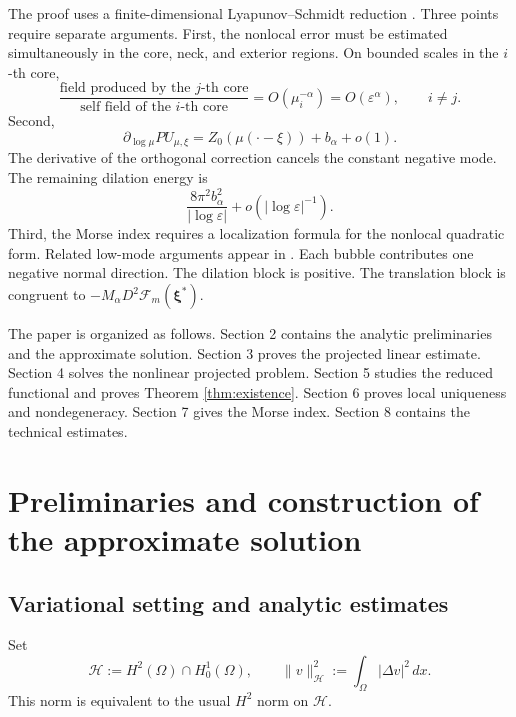 \documentclass[11pt]{article}
\numberwithin{equation}{section}
\begin{document}
The proof uses a finite-dimensional Lyapunov--Schmidt reduction
\cite{AmbrosettiMalchiodi}. Three points require separate arguments.
First, the nonlocal error must be estimated simultaneously in the
core, neck, and exterior regions. On bounded scales in the $i$-th
core,
\begin{equation*}
\frac{\text{field produced by the $j$-th core}}
{\text{self field of the $i$-th core}}
=O(\mu_i^{-\alpha})=O(\varepsilon^\alpha),
\qquad i\ne j.
\end{equation*}
Second,
\begin{equation*}
\partial_{\log\mu}PU_{\mu,\xi}
=Z_0(\mu(\cdot-\xi))+b_\alpha+o(1).
\end{equation*}
The derivative of the orthogonal correction cancels the constant
negative mode.  The remaining dilation energy is
\begin{equation*}
\frac{8\pi^2b_\alpha^2}{|\log\varepsilon|}
+o(|\log\varepsilon|^{-1}).
\end{equation*}
Third, the Morse index requires a localization formula for the
nonlocal quadratic form.  Related low-mode arguments appear in
\cite{BatesShi,ChoiKimLee,GladialiGrossiOhtsukaSuzuki}.  Each bubble contributes one negative normal
direction.  The dilation block is positive.  The translation block is
congruent to $-M_\alpha D^2\mathcal F_m(\boldsymbol\xi^*)$.

The paper is organized as follows.  Section 2 contains the analytic
preliminaries and the approximate solution.  Section 3 proves the
projected linear estimate.  Section 4 solves the nonlinear projected
problem.  Section 5 studies the reduced functional and proves Theorem
\ref{thm:existence}.  Section 6 proves local uniqueness and
nondegeneracy.  Section 7 gives the Morse index.  Section 8 contains
the technical estimates.

\section{Preliminaries and construction of the approximate solution}

\subsection{Variational setting and analytic estimates}

Set
\begin{equation}\label{eq:energy-space}
\mathcal H:=H^2(\Omega)\cap H_0^1(\Omega),
\qquad
\|v\|_{\mathcal H}^2:=\int_\Omega|\Delta v|^2\,dx.
\end{equation}
This norm is equivalent to the usual $H^2$ norm on $\mathcal H$.
\end{document}
